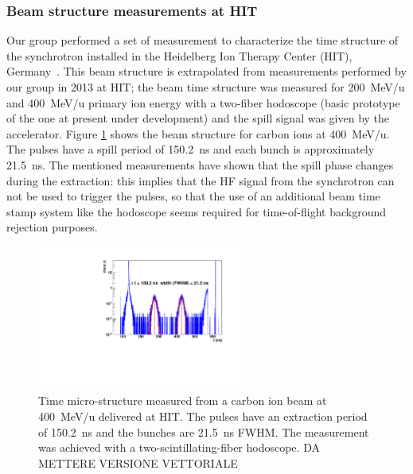 \subsubsection{Beam structure measurements at HIT}
Our group performed a set of measurement to characterize the time structure of the synchrotron installed in the Heidelberg Ion Therapy Center (HIT), Germany~\cite{HIT_timeStructure}.
This beam structure is extrapolated from measurements performed by our group in 2013 at HIT; the beam time structure was measured for 200~MeV/u and 400~MeV/u primary ion energy with a two-fiber hodoscope (basic prototype of the one at present under development) and the spill signal was given by the accelerator. Figure \ref{fig:fig_structure_temps_faisceau_HIT_2013_CC_simulation_Hadronth} shows the beam structure for carbon ions at 400~MeV/u. The pulses have a spill period of 150.2~ns and each bunch is approximately 21.5~ns.
The mentioned measurements have shown that the spill phase changes during the extraction: this implies that the HF signal from the synchrotron can not be used to trigger the pulses, so that the use of an additional beam time stamp system like the hodoscope seems required for time-of-flight background rejection purposes.

\begin{figure} [!hbtp]	
  \centering
  \includegraphics[width=0.6\textwidth]{./Figure/fiber_vert_hor_run14.pdf}
  \caption{Time micro-structure measured from a carbon ion beam at 400~MeV/u delivered at HIT. The pulses have an extraction period of 150.2~ns and the bunches are 21.5~ns FWHM. The measurement was achieved with a two-scintillating-fiber hodoscope. DA METTERE VERSIONE VETTORIALE}
  \label{fig:fig_structure_temps_faisceau_HIT_2013_CC_simulation_Hadronth}
\end{figure}


